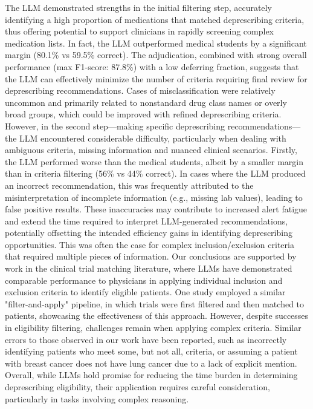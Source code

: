 The LLM demonstrated strengths in the initial filtering step, accurately identifying a high proportion of medications that matched deprescribing criteria, thus offering potential to support clinicians in rapidly screening complex medication lists. In fact, the LLM outperformed medical students by a significant margin (80.1\% vs 59.5\% correct). The adjudication, combined with strong overall performance (max F1-score: 87.8\%) with a low deferring fraction, suggests that the LLM can effectively minimize the number of criteria requiring final review for deprescribing recommendations. Cases of misclassification were relatively uncommon and primarily related to nonstandard drug class names or overly broad groups, which could be improved with refined deprescribing criteria. However, in the second step—making specific deprescribing recommendations—the LLM encountered considerable difficulty, particularly when dealing with ambiguous criteria, missing information and nuanced clinical scenarios. Firstly, the LLM performed worse than the medical students, albeit by a smaller margin than in criteria filtering (56\% vs 44\% correct). In cases where the LLM produced an incorrect recommendation, this was frequently attributed to the misinterpretation of incomplete information (e.g., missing lab values), leading to false positive results. These inaccuracies may contribute to increased alert fatigue and extend the time required to interpret LLM-generated recommendations, potentially offsetting the intended efficiency gains in identifying deprescribing opportunities. This was often the case for complex inclusion/exclusion criteria that required multiple pieces of information. Our conclusions are supported by work in the clinical trial matching literature, where LLMs have demonstrated comparable performance to physicians in applying individual inclusion and exclusion criteria to identify eligible patients\citep{guptaPRISMPatientRecords2024}. One study employed a similar "filter-and-apply" pipeline, in which trials were first filtered and then matched to patients, showcasing the effectiveness of this approach\citep{ferberEndEndClinicalTrial2024}. However, despite successes in eligibility filtering, challenges remain when applying complex criteria. Similar errors to those observed in our work have been reported, such as incorrectly identifying patients who meet some, but not all, criteria, or assuming a patient with breast cancer does not have lung cancer due to a lack of explicit mention\citep{beattieUtilizingLargeLanguage2024, nievasDistillingLargeLanguage2024}. Overall, while LLMs hold promise for reducing the time burden in determining deprescribing eligibility, their application requires careful consideration, particularly in tasks involving complex reasoning.


